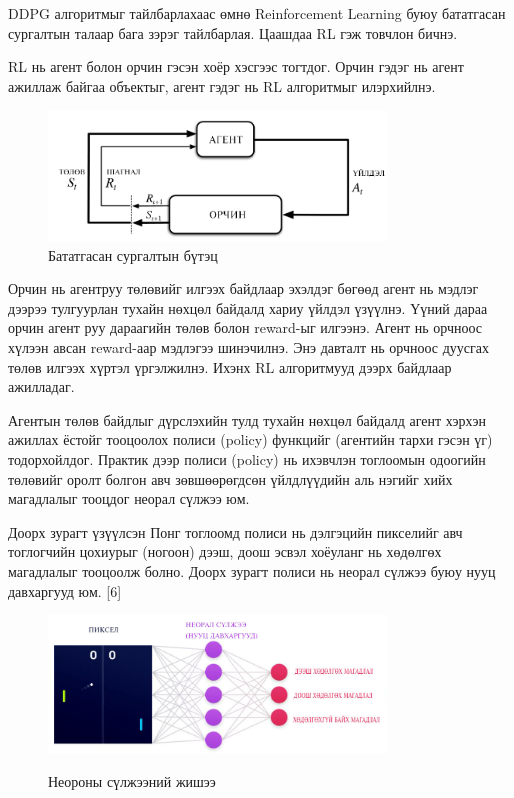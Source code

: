 \documentclass[12pt,A4]{report}
\begin{document}
DDPG алгоритмыг тайлбарлахаас өмнө Reinforcement Learning буюу бататгасан сургалтын талаар бага зэрэг тайлбарлая. Цаашдаа RL гэж товчлон бичнэ.

RL нь агент болон орчин гэсэн хоёр хэсгээс тогтдог. Орчин гэдэг нь агент ажиллаж байгаа объектыг, агент гэдэг нь RL алгоритмыг илэрхийлнэ.

\begin{figure}[H]
\centering
\includegraphics[width=0.8\textwidth]{./images/rl}
\caption{Бататгасан сургалтын бүтэц}
\end{figure}

Орчин нь агентруу төлөвийг илгээх байдлаар эхэлдэг бөгөөд агент нь мэдлэг дээрээ тулгуурлан тухайн нөхцөл байдалд хариу үйлдэл үзүүлнэ. Үүний дараа орчин агент руу дараагийн төлөв болон reward-ыг илгээнэ. Агент нь орчноос хүлээн авсан reward-аар мэдлэгээ шинэчилнэ. Энэ давталт нь орчноос дуусгах төлөв илгээх хүртэл үргэлжилнэ. Ихэнх RL алгоритмууд дээрх байдлаар ажилладаг.

Агентын төлөв байдлыг дүрслэхийн тулд тухайн нөхцөл байдалд агент хэрхэн ажиллах ёстойг тооцоолох полиси (policy) функцийг (агентийн тархи гэсэн үг) тодорхойлдог. Практик дээр полиси (policy) нь ихэвчлэн тоглоомын одоогийн төлөвийг оролт болгон авч зөвшөөрөгдсөн үйлдлүүдийн аль нэгийг хийх магадлалыг тооцдог неорал сүлжээ юм.

Доорх зурагт үзүүлсэн Понг тоглоомд полиси нь дэлгэцийн пикселийг авч тоглогчийн цохиурыг (ногоон) дээш, доош эсвэл хоёуланг нь хөдөлгөх магадлалыг тооцоолж болно. Доорх зурагт полиси нь неорал сүлжээ буюу нууц давхаргууд юм. [6]

\begin{figure}[H]
\centering
\href{https://openai.com/content/images/2017/03/first-graphic-1.png}{\includegraphics[width=0.8\textwidth]{./images/neural_network}}
\caption{Неороны сүлжээний жишээ}
\end{figure}
\end{document}

